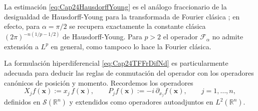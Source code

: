             \begin{remark}
                La estimación \eqref{eq:Cap24HausdorffYoung} es el análogo fraccionario de la desigualdad de Hausdorff-Young para la transformada de Fourier clásica \citep[Thm. 2.2.14]{grafakos2014classical}; en efecto, para $\alpha = \pi/2$ se recupera exactamente la constante clásica $(2\pi)^{-n(1/p-1/2)}$ de Hausdorff-Young. Para $p>2$ el operador $\mathcal{F}_\alpha$ no admite extensión a $L^p$ en general, como tampoco lo hace la Fourier clásica.
            \end{remark}


            La formulación hiperdiferencial \eqref{eq:Cap24TFFrDifNd} es particularmente adecuada para deducir las reglas de conmutación del operador con los operadores canónicos de posición y momento. Recordemos los operadores
            \begin{equation*}
                X_j f(\mathbf{x}) := x_j\,f(\mathbf{x}),\qquad P_j f(\mathbf{x}) := -i\,\partial_{x_j}f(\mathbf{x}),\qquad j=1,\dots,n,
            \end{equation*}
            definidos en $\mathcal{S}(\mathbb{R}^n)$ y extendidos como operadores autoadjuntos en $L^2(\mathbb{R}^n)$.

